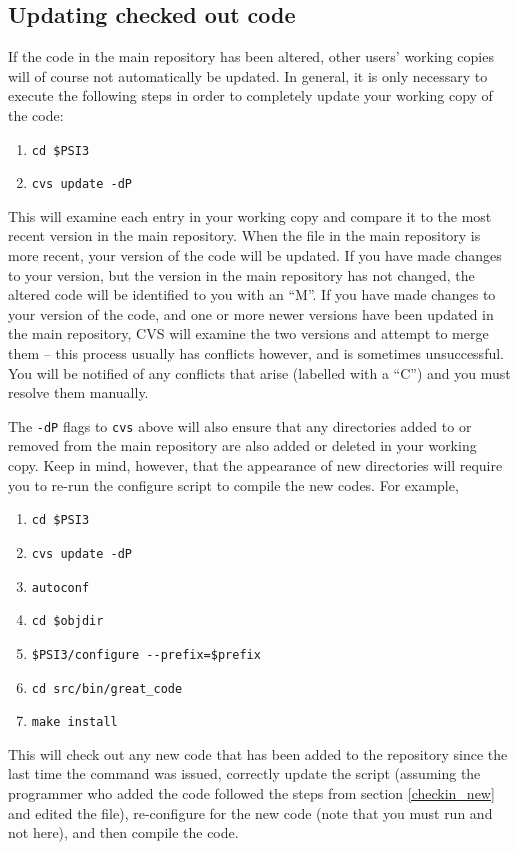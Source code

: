\subsection{Updating checked out code}

If the code in the main repository has been altered, other users' working
copies will of course not automatically be updated.  In general, it is
only necessary to execute the following steps in order to completely update
your working copy of the code:

\begin{enumerate}
\item {\tt cd \$PSI3}
\item {\tt cvs update -dP}
\end{enumerate}

This will examine each entry in your working copy and compare it to the most
recent version in the main repository. When the file in the main repository
is more recent, your version of the code will be updated. If you have made
changes to your version, but the version in the main repository has not
changed, the altered code will be identified to you with an ``M''. If you
have made changes to your version of the code, and one or more newer versions
have been updated in the main repository, CVS will examine the two versions
and attempt to merge them -- this process usually has conflicts however,
and is sometimes unsuccessful. You will be notified of any conflicts that
arise (labelled with a ``C'') and you must resolve them manually.

The {\tt -dP} flags to {\tt cvs} above will also ensure that any
directories added to or removed from the main repository are also added or
deleted in your working copy.  Keep in mind, however, that the appearance
of new directories will require you to re-run the configure script to
compile the new codes.  For example,

\begin{enumerate}
\item {\tt cd \$PSI3}
\item {\tt cvs update -dP}
\item {\tt autoconf}
\item {\tt cd \$objdir}
\item {\tt \$PSI3/configure -}{\tt -prefix=\$prefix}
\item {\tt cd src/bin/great\_code}
\item {\tt make install}
\end{enumerate}
This will check out any new code that has been added to the repository since 
the last time the  command was issued, correctly update 
the  script (assuming the programmer who added the code 
followed the steps from section \ref{checkin_new} and edited the 
 file), re-configure for the new code (note that
you must run  and not  here), and 
then compile the code.

